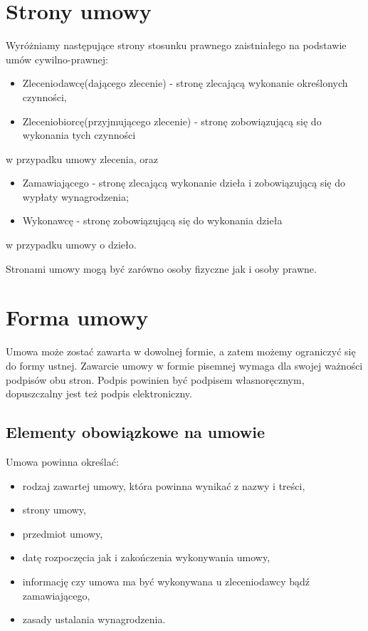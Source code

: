 \section[Strony umowy][Strony umowy]{Strony umowy}
Wyróżniamy następujące strony stosunku prawnego zaistniałego na podstawie umów cywilno-prawnej:
\begin{itemize}
	\item Zleceniodawcę(dającego zlecenie) - stronę zlecającą wykonanie określonych czynności,
	\item Zleceniobiorcę(przyjmującego zlecenie) - stronę zobowiązującą się do wykonania tych czynności
\end{itemize}
w przypadku umowy zlecenia, oraz
\begin{itemize}
	\item Zamawiającego - stronę zlecającą wykonanie dzieła i zobowiązującą się do wypłaty wynagrodzenia;
	\item Wykonawcę - stronę zobowiązującą się do wykonania dzieła
\end{itemize}
w przypadku umowy o dzieło.

Stronami umowy mogą być zarówno osoby fizyczne jak i osoby prawne.

\section[Forma umowy][Forma umowy]{Forma umowy}
Umowa może zostać zawarta w dowolnej formie, a zatem możemy ograniczyć się do formy ustnej. Zawarcie umowy w formie pisemnej wymaga dla swojej ważności podpisów obu stron. Podpis powinien być podpisem własnoręcznym, dopuszczalny jest też podpis elektroniczny.

\subsection[Elementy obowiązkowe na umowie][Elementy obowiązkowe na umowie]{Elementy obowiązkowe na umowie}
Umowa powinna określać:
\begin{itemize}
\item rodzaj zawartej umowy, która powinna wynikać z nazwy i treści,
\item strony umowy,
\item przedmiot umowy,
\item datę rozpoczęcia jak i zakończenia wykonywania umowy,
\item informację czy umowa ma być wykonywana u zleceniodawcy bądź zamawiającego,
\item zasady ustalania wynagrodzenia.
\end{itemize}

